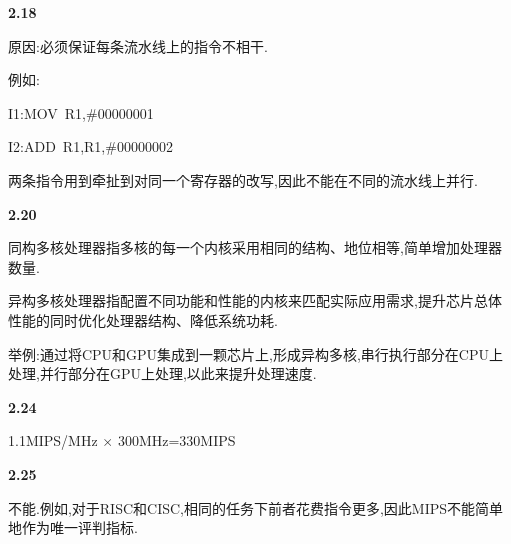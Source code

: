 \documentclass{article}
\begin{document}
    \noindent\textbf{2.18}\par
    原因:必须保证每条流水线上的指令不相干.\par
    例如:\par
    \qquad I1:\qquad MOV\ R1,\#00000001\par
    \qquad I2:\qquad ADD\ R1,R1,\#00000002\par
    两条指令用到牵扯到对同一个寄存器的改写,因此不能在不同的流水线上并行.
    \\[4pt]\par

    \noindent\textbf{2.20}\par
    同构多核处理器指多核的每一个内核采用相同的结构、地位相等,简单增加处理器数量.\par
    异构多核处理器指配置不同功能和性能的内核来匹配实际应用需求,提升芯片总体性能的同时优化处理器结构、降低系统功耗.\par
    举例:通过将CPU和GPU集成到一颗芯片上,形成异构多核,串行执行部分在CPU上处理,并行部分在GPU上处理,以此来提升处理速度.
    \\[4pt]\par

    \noindent\textbf{2.24}\par
    1.1MIPS/MHz $\times$ 300MHz=330MIPS
    \\[4pt]\par

    \noindent\textbf{2.25}\par
    不能.例如,对于RISC和CISC,相同的任务下前者花费指令更多,因此MIPS不能简单地作为唯一评判指标.
    \\[4pt]\par
\end{document}
